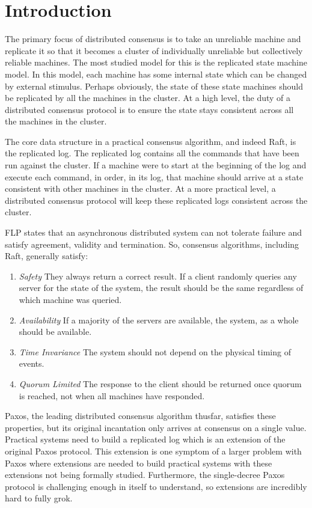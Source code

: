 \section{Introduction}

The primary focus of distributed consensus is to take an unreliable machine and replicate it so that it becomes a cluster of individually unreliable but collectively reliable machines.
The most studied model for this is the replicated state machine model.
In this model, each machine has some internal state which can be changed by external stimulus.
Perhaps obviously, the state of these state machines should be replicated by all the machines in the cluster.
At a high level, the duty of a distributed consensus protocol is to ensure the state stays consistent across all the machines in the cluster.

The core data structure in a practical consensus algorithm, and indeed Raft, is the replicated log.
The replicated log contains all the commands that have been run against the cluster.
If a machine were to start at the beginning of the log and execute each command, in order, in its log, that machine should arrive at a state consistent with other machines in the cluster.
At a more practical level, a distributed consensus protocol will keep these replicated logs consistent across the cluster.

FLP states that an asynchronous distributed system can not tolerate failure and satisfy agreement, validity and termination. \cite{flp-theorem}
So, consensus algorithms, including Raft, generally satisfy:
\begin{enumerate}
    \item \textit{Safety} They always return a correct result.
    If a client randomly queries any server for the state of the system, the result should be the same regardless of which machine was queried.
    \item \textit{Availability} If a majority of the servers are available, the system, as a whole should be available.
    \item \textit{Time Invariance} The system should not depend on the physical timing of events.
    \item \textit{Quorum Limited} The response to the client should be returned once quorum is reached, not when all machines have responded.
\end{enumerate}

Paxos, the leading distributed consensus algorithm thusfar, satisfies these properties, but its original incantation only arrives at consensus on a single value. \cite{long-form-paxos}
Practical systems need to build a replicated log which is an extension of the original Paxos protocol.
This extension is one symptom of a larger problem with Paxos where extensions are needed to build practical systems with these extensions not being formally studied.
Furthermore, the single-decree Paxos protocol is challenging enough in itself to understand, so extensions are incredibly hard to fully grok.

